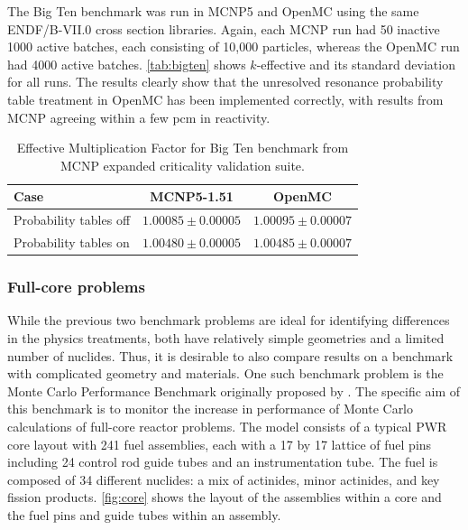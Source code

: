 \documentclass[authoryear,preprint]{elsarticle}
\begin{document}
The Big Ten benchmark was run in MCNP5 and OpenMC using the same ENDF/B-VII.0
cross section libraries. Again, each MCNP run had 50 inactive 1000 active
batches, each consisting of 10,000 particles, whereas the OpenMC run had 4000
active batches. \autoref{tab:bigten} shows $k$-effective and its standard
deviation for all runs. The results clearly show that the unresolved resonance
probability table treatment in OpenMC has been implemented correctly, with
results from MCNP agreeing within a few pcm in reactivity.

\begin{table}
  \caption{Effective Multiplication Factor for Big Ten benchmark from MCNP
    expanded criticality validation suite.}
  \label{tab:bigten}
  \begin{center}
  \begin{tabular}{ l c c }
    \hline
    Case & MCNP5-1.51 & OpenMC \\
    \hline
    Probability tables off & $1.00085 \pm 0.00005$ & $1.00095 \pm 0.00007$ \\
    Probability tables on  & $1.00480 \pm 0.00005$ & $1.00485 \pm 0.00007$ \\
    \hline
  \end{tabular}
  \end{center}
\end{table}

\subsubsection{Full-core problems}

While the previous two benchmark problems are ideal for identifying differences
in the physics treatments, both have relatively simple geometries and a limited
number of nuclides. Thus, it is desirable to also compare results on a benchmark
with complicated geometry and materials. One such benchmark problem is the Monte
Carlo Performance Benchmark originally proposed by \citet{hoogenboom}. The
specific aim of this benchmark is to monitor the increase in performance of
Monte Carlo calculations of full-core reactor problems. The model consists of a
typical PWR core layout with 241 fuel assemblies, each with a 17 by 17 lattice
of fuel pins including 24 control rod guide tubes and an instrumentation
tube. The fuel is composed of 34 different nuclides: a mix of actinides, minor
actinides, and key fission products. \autoref{fig:core} shows the layout of the
assemblies within a core and the fuel pins and guide tubes within an assembly.
\end{document}
